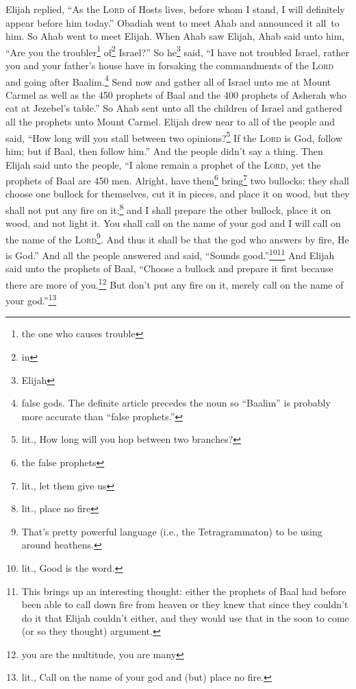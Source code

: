 \begin{inparaenum}
     Elijah replied, ``As the \textsc{Lord} of Hosts lives, before whom I stand, I will definitely appear before him today.''%
     Obadiah went to meet Ahab and announced it all\understood\ to him. So Ahab went to meet Elijah.%
     When Ahab saw Elijah, Ahab said unto him, ``Are you the troubler\footnote{the one who causes trouble} of\footnote{in} Israel?''%
     So he\footnote{Elijah} said, ``I have not troubled Israel, rather you and your father's house have in forsaking the commandments of the \textsc{Lord} and going after Baalim.\footnote{false gods. The definite article precedes the noun so ``Baalim'' is probably more accurate than ``false prophets.''}%
     Send now and gather all of Israel unto me at Mount Carmel as well as the 450 prophets of Baal and the 400 prophets of Asherah who eat at Jezebel's table.''%
     So Ahab sent unto all the children of Israel and gathered all the prophets unto Mount Carmel.%
     Elijah drew near to all of the people and said, ``How long will you stall between two opinions?\footnote{lit., How long will you hop between two branches?} If the \textsc{Lord} is God, follow him; but if Baal, then follow him.'' And the people didn't say a thing.%
     Then Elijah said unto the people, ``I alone remain a prophet of the \textsc{Lord}, yet the prophets of Baal are 450 men.%
     Alright, have them\footnote{the false prophets} bring\footnote{lit., let them give us} two bullocks: they shall choose one bullock for themselves, cut it in pieces, and place it on wood, but they shall not put any fire on it;\footnote{lit., place no fire} and I shall prepare the other bullock, place it on wood, and not light it.%
     You shall call on the name of your god and I will call on the name of the \textsc{Lord}\footnote{That's pretty powerful language (i.e., the Tetragrammaton) to be using around heathens.}. And thus it shall be that the god who answers by fire, He is God.'' And all the people answered and said, ``Sounds good.''\footnote{lit., Good is the word.}\footnote{This brings up an interesting thought: either the prophets of Baal had before been able to call down fire from heaven or they knew that since they couldn't do it that Elijah couldn't either, and they would use that in the soon to come (or so they thought) argument.}%
     And Elijah said unto the prophets of Baal, ``Choose a bullock and prepare it first because there are more of you.\footnote{you are the multitude, you are many} But don't put any fire on it, merely call on the name of your god.''\footnote{lit., Call on the name of your god and (but) place no fire.}%

\end{inparaenum}
